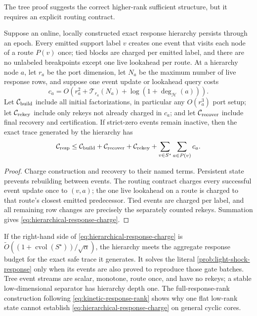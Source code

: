 The tree proof suggests the correct higher-rank sufficient structure, but it
requires an explicit routing contract.

\begin{lemma}
\label{lem:hierarchical-response-charge}
Suppose an online, locally constructed exact response hierarchy persists
through an epoch.  Every emitted support label $v$ creates one event that
visits each node of a route $P(v)$ once; tied blocks are charged per emitted
label, and there are no unlabeled breakpoints except one live lookahead per
route.  At a hierarchy node $a$, let $r_a$ be the port dimension, let $N_a$
be the maximum number of live response rows, and suppose one event update or
lookahead query costs
\begin{equation}
 c_a=O\!\left(
  r_a^2+\mathcal T_{r_a}(N_a)+\log(1+\deg_{\mathcal H}(a))
 \right).
 \label{eq:hierarchical-node-charge}
\end{equation}
Let $\mathcal C_{\rm build}$ include all initial factorizations, in particular
any $O(r_a^3)$ port setup; let $\mathcal C_{\rm rekey}$ include only rekeys
not already charged in $c_a$; and let $\mathcal C_{\rm recover}$ include
final recovery and certification.  If strict-zero events remain inactive,
then the exact trace generated by the hierarchy has
\begin{equation}
 \mathcal C_{\rm resp}
 \leq
 \mathcal C_{\rm build}+\mathcal C_{\rm recover}
 +\mathcal C_{\rm rekey}
 +\sum_{v\in S^\star}\sum_{a\in P(v)}c_a.
 \label{eq:hierarchical-response-charge}
\end{equation}
\end{lemma}

\begin{proof}
Charge construction and recovery to their named terms.  Persistent state
prevents rebuilding between events.  The routing contract charges every
successful event update once to $(v,a)$; the one live lookahead on a route is
charged to that route's closest emitted predecessor.  Tied events are charged
per label, and all remaining row changes are precisely the separately counted
rekeys.  Summation gives \cref{eq:hierarchical-response-charge}.
\end{proof}

If the right-hand side of \cref{eq:hierarchical-response-charge} is
$\widetilde O((1+\operatorname{cvol}(S^\star))/\sqrt\alpha)$, the hierarchy
meets the aggregate response budget for the exact safe trace it generates.
It solves the literal \cref{prob:light-shock-response} only when its events are
also proved to reproduce those gate batches.  Tree event streams are scalar,
monotone, route once, and have no rekeys; a stable low-dimensional separator
has hierarchy depth one.  The full-response-rank construction following
\cref{eq:kinetic-response-rank} shows why one flat low-rank state cannot
establish \cref{eq:hierarchical-response-charge} on general cyclic cores.

